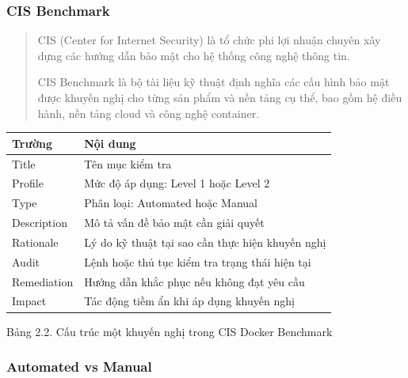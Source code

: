 \protect{}\label{CIS_Docker_Benchmark}{}

\subsubsection{CIS Benchmark}\label{cis-benchmark}

\begin{quote}
CIS (Center for Internet Security) là tổ chức phi lợi nhuận chuyên xây dựng các hướng dẫn bảo mật cho hệ thống công nghệ thông tin.

CIS Benchmark là bộ tài liệu kỹ thuật định nghĩa các cấu hình bảo mật được khuyến nghị cho từng sản phẩm và nền tảng cụ thể, bao gồm hệ điều hành, nền tảng cloud và công nghệ container.
\end{quote}

{\def\LTcaptype{none} %
\begin{longtable}[]{@{}
  >{\raggedright\arraybackslash}p{}
  >{\raggedright\arraybackslash}p{}@{}}
\toprule\noalign{}
\begin{minipage}[b]{\linewidth}\raggedright
\protect{}\label{_bookmark18}{}\textbf{Trường}
\end{minipage} & \begin{minipage}[b]{\linewidth}\raggedright
\textbf{Nội dung}
\end{minipage} \\
\midrule\noalign{}
\endhead
\bottomrule\noalign{}
\endlastfoot
Title & Tên mục kiểm tra \\
Profile & Mức độ áp dụng: Level 1 hoặc Level 2 \\
Type & Phân loại: Automated hoặc Manual \\
Description & Mô tả vấn đề bảo mật cần giải quyết \\
Rationale & Lý do kỹ thuật tại sao cần thực hiện khuyến nghị \\
Audit & Lệnh hoặc thủ tục kiểm tra trạng thái hiện tại \\
Remediation & Hướng dẫn khắc phục nếu không đạt yêu cầu \\
Impact & Tác động tiềm ẩn khi áp dụng khuyến nghị \\
\end{longtable}
}

Bảng 2.2. Cấu trúc một khuyến nghị trong CIS Docker Benchmark

\subsubsection{Automated vs Manual}\label{automated-vs-manual}

